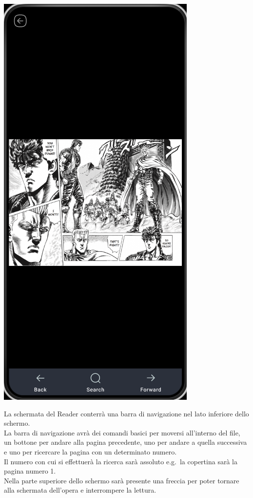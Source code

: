 \documentclass{report}
\newcommand{\ignore}[1]{}
\begin{document}
\begin{center}
   \includegraphics[scale=0.4]{reader.png}   
\end{center}

La schermata del Reader conterrà una barra di navigazione nel lato inferiore dello schermo.\\
La barra di navigazione avrà dei comandi basici per moversi all'interno del file, un bottone per andare alla pagina precedente, uno per andare a quella successiva e uno per ricercare la pagina con un determinato numero.\\
Il numero con cui si effettuerà la ricerca sarà assoluto e.g.\ la copertina sarà la pagina numero 1.\\
Nella parte superiore dello schermo sarà presente una freccia per poter tornare alla \ignore{\hyperref[sec:home]{Library \- Home page}} schermata dell'opera e interrompere la lettura.
\end{document}
